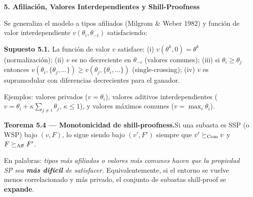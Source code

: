 \documentclass[20pt]{extarticle}
\renewcommand{\small}{\fontsize{20}{25}\selectfont}
\renewcommand{\footnotesize}{\fontsize{18}{22}\selectfont}
\newcommand{\stit}[1]{{\fontsize{38}{46}\selectfont\color{ink}\textbf{#1}}}
\begin{document}
\vspace{12mm}
\noindent\hspace{3cm}{\color{rulegray}\rule{84cm}{2.5pt}}
\vspace{12mm}


\noindent\hspace{3cm}%
\begin{minipage}[t]{47cm}


  \stit{5. Afiliación, Valores Interdependientes y Shill-Proofness}

  \vspace{6mm}
  {\small\justifying Se generaliza el modelo a tipos afiliados (Milgrom \& Weber 1982) y función de valor interdependiente $v(\theta_i, \theta_{-i})$ satisfaciendo:}

  \vspace{4mm}
  \begin{tcolorbox}[shaded]
    \footnotesize\textbf{Supuesto 5.1.} La función de valor $v$ satisface: (i) $v(\theta^k,0)=\theta^k$ (normalización); (ii) $v$ es no decreciente en $\theta_{-i}$ (valores comunes); (iii) si $\theta_i\geq\theta_j$ entonces $v(\theta_i,\{\theta_j,\ldots\})\geq v(\theta_j,\{\theta_i,\ldots\})$ (single-crossing); (iv) $v$ es supramodular con diferencias decrecientes para el ganador.

    \smallskip Ejemplos: valores privados ($v=\theta_i$), valores aditivos interdependientes ($v=\theta_i+\kappa\sum_{j\neq i}\theta_j$, $\kappa\leq 1$), y valores máximos comunes ($v=\max_i\theta_i$).
  \end{tcolorbox}

  \vspace{6mm}
  \begin{tcolorbox}[shaded]
    \footnotesize\textbf{Teorema 5.4 — Monotonicidad de shill-proofness.}\enspace Si una subasta es SSP (o WSP) bajo $(v,F)$, lo sigue siendo bajo $(v',F')$ siempre que $v'\succeq_{\rm Com} v$ y $F\succeq_{\rm Aff} F'$.

    \medskip En palabras: \emph{tipos más afiliados o valores más comunes hacen que la propiedad SP sea \textbf{más difícil} de satisfacer.} Equivalentemente, si el entorno se vuelve menos correlacionado y más privado, el conjunto de subastas shill-proof se \textbf{expande}.
  \end{tcolorbox}


\end{minipage}
\end{document}
